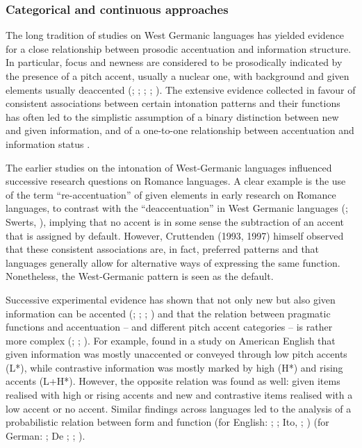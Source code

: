 \subsubsection{ Categorical and continuous approaches}
\hypertarget{Toc191305886}{}
The long tradition of studies on West Germanic languages has yielded evidence for a close relationship between prosodic accentuation and information structure. In particular, focus and newness are considered to be prosodically indicated by the presence of a pitch accent, usually a nuclear one, with background and given elements usually deaccented (\citealt{Cruttenden2006}; \citealt{FérySamek-Lodovici2006}; \citealt{Halliday1967}; \citealt{Ladd1996}; \citealt{Terken1984}). The extensive evidence collected in favour of consistent associations between certain intonation patterns and their functions has often led to the simplistic assumption of a binary distinction between new and given information, and of a one-to-one relationship between accentuation and information status \citep{Halliday1967}.

The earlier studies on the intonation of West-Germanic languages influenced successive research questions on Romance languages. A clear example is the use of the term “re-accentuation” of given elements in early research on Romance languages, to contrast with the “deaccentuation” in West Germanic languages (\citealt{Cruttenden1993}; Swerts, \citealt{AvesaniKrahmer1999}), implying that no accent is in some sense the subtraction of an accent that is assigned by default. However, Cruttenden (1993, 1997) himself observed that these consistent associations are, in fact, preferred patterns and that languages generally allow for alternative ways of expressing the same function. Nonetheless, the West-Germanic pattern is seen as the default.

Successive experimental evidence has shown that not only new but also given information can be accented (\citealt{BardAylett1999}; \citealt{RiesterPiontek2015}; \citealt{SchweitzerEtAl2009}; \citealt{TerkenHirschberg1994}) and that the relation between pragmatic functions and accentuation – and different pitch accent categories – is rather more complex (\citealt{GriceEtAl2017}; \citealt{KrahmerSwerts2001}; \citealt{MückeGrice2014}). For example, \citet{ChodroffCole2019} found in a study on American English that given information was mostly unaccented or conveyed through low pitch accents (L*), while contrastive information was mostly marked by high (H*) and rising accents (L+H*). However, the opposite relation was found as well: given items realised with high or rising accents and new and contrastive items realised with a low accent or no accent. Similar findings across languages led to the analysis of a probabilistic relation between form and function (for English: \citealt{Calhoun2010}; \citealt{ChodroffEtAl2019}; Ito, \citealt{SpeerBeckman2004}; \citealt{Yoon2010}) (for German: \citealt{BaumannRiester2013}; De \citealt{Ruiter2015}; \citealt{KurumadaRoettger2022}; \citealt{RöhrBaumann2010}).

